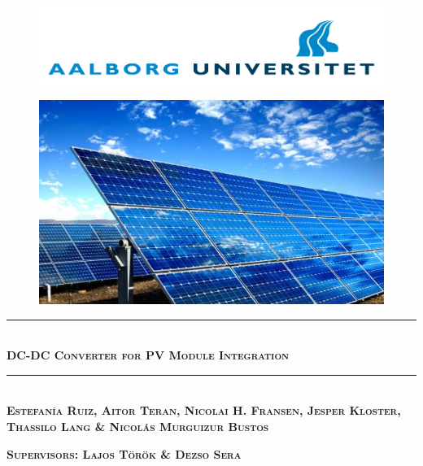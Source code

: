 
\usepackage[export]{adjustbox}

\newcommand\tab[1][1cm]{\hspace*{#1}}


	
\begin{titlingpage}

	
\newcommand{\HRule}{\rule{\linewidth}{0.1mm}} %

\vspace*{-2cm}
\begin{figure}[htbp]
	\begin{center}
		\includegraphics[width=\textwidth]{../Pictures/AAU_logo}
		\label{aau_logo}
	\end{center}	
\end{figure}

\vspace*{2cm}
\begin{figure}[htbp]
	\begin{center}
		\includegraphics[width=\textwidth]{../Pictures/frontpage_pvpanel.png}
		\label{frontpage}
	\end{center}	
\end{figure}

\begin{center}
\vspace*{0.5cm}
\HRule \\[0.8cm]
{\huge \bfseries \textsc{DC-DC Converter for PV Module Integration}}\\[0.2cm]
\HRule \\[1.5cm]

\textsc{\textbf{Estefanía Ruiz, Aitor Teran, Nicolai H. Fransen, Jesper Kloster, Thassilo Lang \& Nicolás Murguizur Bustos}}


\vspace*{1cm}
\textsc{\textbf{Supervisors: Lajos Török \& Dezso Sera}}
\end{center}
\end{titlingpage}

